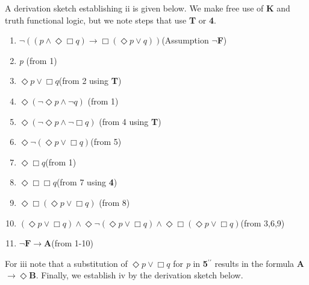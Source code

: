 \documentclass[
  11pt,
  letterpaper,
  DIV=11,
  numbers=noendperiod,
  twoside]{scrartcl}
\providecommand{\tightlist}{%
  \setlength{\itemsep}{0pt}\setlength{\parskip}{0pt}}
\begin{document}
A derivation sketch establishing ii is given below. We make free use of
\textbf{K} and truth functional logic, but we note steps that use
\textbf{T} or \textbf{4}.

\begin{enumerate}
\def\labelenumi{\arabic{enumi}.}
\tightlist
\item
  \(\neg ((p\wedge \Diamond\Box q) \rightarrow \Box (\Diamond{p}\vee q))\)(Assumption
  \(\neg\)\textbf{F})
\item
  \emph{p} (from 1)
\item
  \(\Diamond{p}\vee \Box q\)(from 2 using \textbf{T})
\item
  \(\Diamond(\neg \Diamond{p}\wedge \neg q)\) (from 1)
\item
  \(\Diamond(\neg \Diamond{p}\wedge \neg \Box q)\) (from 4 using
  \textbf{T})
\item
  \(\Diamond\neg (\Diamond{p}\vee \Box q)\)(from 5)
\item
  \(\Diamond\Box q\)(from 1)
\item
  \(\Diamond\Box \Box q\)(from 7 using \textbf{4})
\item
  \(\Diamond\Box (\Diamond{p}\vee \Box q)\) (from 8)
\item
  \((\Diamond{p}\vee \Box q) \wedge \Diamond\neg (\Diamond{p}\vee \Box q)\wedge \Diamond\Box (\Diamond{p}\vee \Box q)\)(from
  3,6,9)
\item
  \(\neg \textbf{F} \rightarrow \textbf{A}\)(from 1-10)
\end{enumerate}

For iii note that a substitution of \(\Diamond{p}\vee \Box q\) for
\emph{p} in \textbf{5}\(^{\prime\prime}\) results in the formula
\textbf{A}\(\rightarrow \Diamond\textbf{B}\). Finally, we establish iv
by the derivation sketch below.
\end{document}
